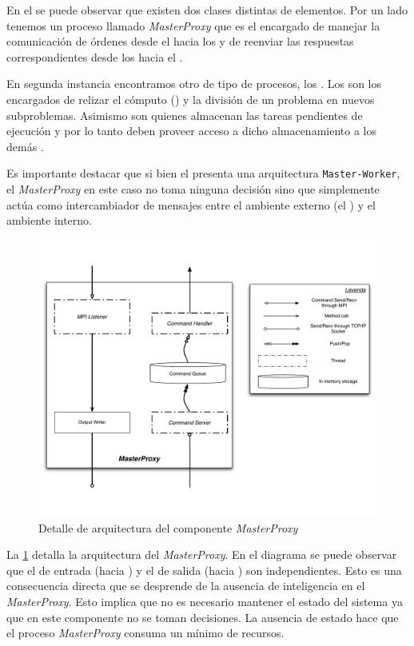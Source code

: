 \newcommand{\master}{\emph{MasterProxy}\xspace}

En el \bend se puede observar que existen dos clases distintas de elementos.
Por un lado tenemos un proceso llamado \master que es el encargado de manejar
la comunicación de órdenes desde el \fend hacia los \ws y de reenviar las
respuestas correspondientes desde los \ws hacia el \fend.

En segunda instancia encontramos otro de tipo de procesos, los \ws. Los \ws
son los encargados de relizar el cómputo (\ssolving) y la división de un
problema en nuevos subproblemas. Asimismo son quienes almacenan las tareas
pendientes de ejecución y por lo tanto deben proveer acceso a dicho
almacenamiento a los demás \ws.

\newcommand{\masterslave}{\texttt{Master-Worker}\xspace}

Es importante destacar que si bien el \bend presenta una arquitectura
\masterslave, el \master en este caso no toma ninguna decisión sino que
simplemente actúa como intercambiador de mensajes entre el ambiente externo
(el \fend) y el ambiente interno.

\begin{figure}[h!]
\centering
\includegraphics[scale=0.4]{graphs/master proxy detail}
\caption{Detalle de arquitectura del componente \master}
\label{fig:masterproxydetail}
\end{figure}

La \fig\ref{fig:masterproxydetail} detalla la arquitectura del \master. En el
diagrama se puede observar que el \datapath de entrada (\fend hacia \bend) y
el de salida (\bend hacia \fend) son independientes. Esto es una consecuencia
directa que se desprende de la ausencia de inteligencia en el \master. Esto
implica que no es necesario mantener el estado del sistema ya que en este
componente no se toman decisiones. La ausencia de estado hace que el proceso
\master consuma un mínimo de recursos.

